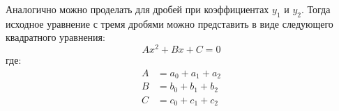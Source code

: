 \documentclass[a4paper]{article}
\begin{document}
Аналогично можно проделать для дробей при коэффициентах $y_1$ и $y_2$.
Тогда исходное уравнение с тремя дробями можно представить в виде следующего квадратного уравнения:
\begin{equation*}
    Ax^2 + Bx + C = 0
\end{equation*}
где:
\begin{align*}
    A &= a_0 + a_1 + a_2 \\
    B &= b_0 + b_1 + b_2 \\
    C &= c_0 + c_1 + c_2
\end{align*}
\end{document}
